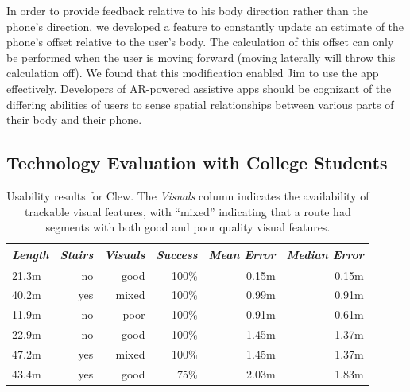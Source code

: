\documentclass[chi_draft]{sigchi}
\begin{document}
In order to provide feedback relative to his body direction rather than the phone's direction, we developed a feature to constantly update an estimate of the phone's offset relative to the user's body.  The calculation of this offset can only be performed when the user is moving forward (moving laterally will throw this calculation off).  We found that this modification enabled Jim to use the app effectively.  Developers of AR-powered assistive apps should be cognizant of the differing abilities of users to sense spatial relationships between various parts of their body and their phone.

\subsection{Technology Evaluation with College Students}

\begin{table}
  \centering
  \begin{tabular}{l r r r | r  r}
    {\small \textit{Length}}
      & {\small \textit{Stairs}}
    & {\small \textit{Visuals}}
        & {\small \textit{Success}}
        & {\small \textit{Mean Error}} 
                & {\small \textit{Median Error}} \\
    \midrule
    21.3m & no & good & 100\% & 0.15m & 0.15m \\
    40.2m & yes & mixed & 100\% & 0.99m & 0.91m \\
    11.9m & no & poor & 100\% & 0.91m & 0.61m \\
    22.9m & no & good & 100\% & 1.45m & 1.37m \\
        47.2m & yes & mixed & 100\%& 1.45m & 1.37m \\
            43.4m & yes & good & 75\% & 2.03m & 1.83m \\
  \end{tabular}
  \caption{Usability results for Clew.  The \emph{Visuals} column indicates the availability of trackable visual features, with ``mixed'' indicating that a route had segments with both good and poor quality visual features.}~\label{tab:clewusability}
\end{table}
\end{document}
